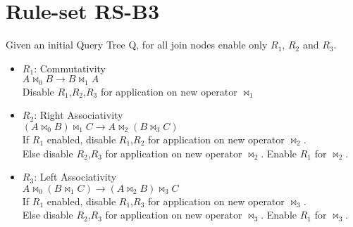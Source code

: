 \section{Rule-set RS-B3}
Given an initial Query Tree Q, for all join nodes enable only $R_{1}$, $R_{2}$ and $R_{3}$.

\begin{itemize}
    \item $R_{1}$: Commutativity \\ $A \bowtie_{0} B \rightarrow B \bowtie_{1} A$ \\
    Disable $R_{1}$,$R_{2}$,$R_{3}$ for application on new operator $\bowtie_{1}$
    \item $R_{2}$: Right Associativity \\ $(A \bowtie_{0} B) \bowtie_{1} C \rightarrow A \bowtie_{2} (B \bowtie_{3} C)$ \\
    If $R_{1}$ enabled, disable $R_{1}$,$R_{2}$ for application on new operator $\bowtie_{2}$. \\
    Else disable $R_{2}$,$R_{3}$ for application on new operator $\bowtie_{2}$. Enable $R_{1}$ for $\bowtie_{2}$.
    \item $R_{3}$: Left Associativity \\ $A \bowtie_{0} (B \bowtie_{1} C) \rightarrow (A \bowtie_{2} B) \bowtie_{3} C$ \\
    If $R_{1}$ enabled, disable $R_{1}$,$R_{3}$ for application on new operator $\bowtie_{3}$. \\
    Else disable $R_{2}$,$R_{3}$ for application on new operator $\bowtie_{3}$. Enable $R_{1}$ for $\bowtie_{3}$.
\end{itemize}